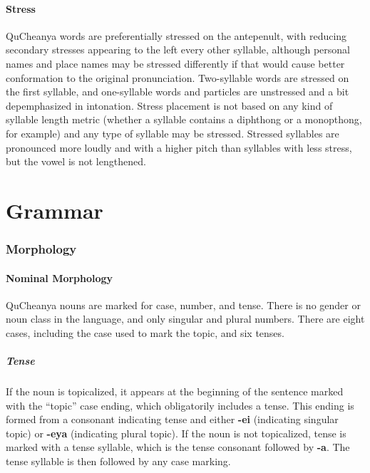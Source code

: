 \documentclass{article}
\begin{document}
\subsection{Stress}
QuCheanya words are preferentially stressed on the antepenult, with reducing secondary stresses appearing to the left every other syllable, although personal names and place names may be stressed differently if that would cause better conformation to the original pronunciation.  Two-syllable words are stressed on the first syllable, and one-syllable words and particles are unstressed and a bit depemphasized in intonation. Stress placement is not based on any kind of syllable length metric (whether a syllable contains a diphthong or a monopthong, for example) and any type of syllable may be stressed. Stressed syllables are pronounced more loudly and with a higher pitch than syllables with less stress, but the vowel is not lengthened.

\newpage

\part{Grammar}
\section{Morphology}
\subsection{Nominal Morphology}
QuCheanya nouns are marked for case, number, and tense.  There is no gender or noun class in the language, and only singular and plural numbers.  There are eight cases, including the case used to mark the topic, and six tenses.

\subsubsection{Tense}

If the noun is topicalized, it appears at the beginning of the sentence marked with the ``topic'' case ending, which obligatorily includes a tense.  This ending is formed from a consonant indicating tense and either \textbf{-ei} (indicating singular topic) or \textbf{-eya} (indicating plural topic).  If the noun is not topicalized, tense is marked with a tense syllable, which is the tense consonant followed by \textbf{-a}. The tense syllable is then followed by any case marking.
\end{document}
